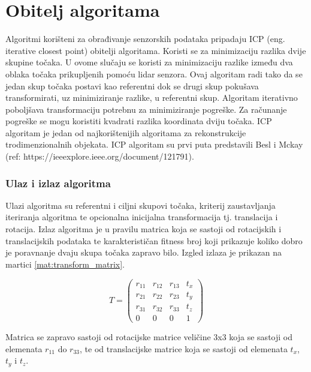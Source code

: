 \section{Obitelj algoritama}

Algoritmi korišteni za obrađivanje senzorskih podataka pripadaju ICP (eng. iterative closest point) obitelji algoritama. Koristi se za minimizaciju razlika dvije skupine točaka. U ovome slučaju se koristi za minimizaciju razlike između dva oblaka točaka prikupljenih pomoću lidar senzora. Ovaj algoritam radi tako da se jedan skup točaka postavi kao referentni dok se drugi skup pokušava transformirati, uz minimiziranje razlike, u referentni skup. Algoritam iterativno poboljšava transformaciju potrebnu za minimiziranje pogreške. Za računanje pogreške se mogu koristiti kvadrati razlika koordinata dviju točaka. ICP algoritam je jedan od najkorištenijih algoritama za rekonstrukcije trodimenzionalnih objekata. ICP algoritam su prvi puta predstavili Besl i Mckay (ref: https://ieeexplore.ieee.org/document/121791).

\subsubsection{Ulaz i izlaz algoritma}

Ulazi algoritma su referentni i ciljni skupovi točaka, kriterij zaustavljanja iteriranja algoritma te opcionalna inicijalna transformacija tj. translacija i rotacija. Izlaz algoritma je u pravilu matrica koja se sastoji od rotacijskih i translacijskih podataka te karakterističan fitness broj koji prikazuje koliko dobro je poravnanje dvaju skupa točaka zapravo bilo. Izgled izlaza je prikazan na martici \ref{mat:transform_matrix}.

\begin{equation}
  T =
  \begin{pmatrix}
    r_{11} & r_{12} & r_{13} & t_{x}\\
    r_{21} & r_{22} & r_{23} & t_{y}\\
    r_{31} & r_{32} & r_{33} & t_{z}\\
    0      & 0      & 0      & 1
  \end{pmatrix}
  \label{mat:transform_matrix}
\end{equation}

Matrica se zapravo sastoji od rotacijske matrice veličine 3x3 koja se sastoji od elemenata $r_{11}$ do $r_{33}$, te od translacijske matrice koja se sastoji od elemenata $t_{x}$, $t_{y}$ i $t_{z}$. 

